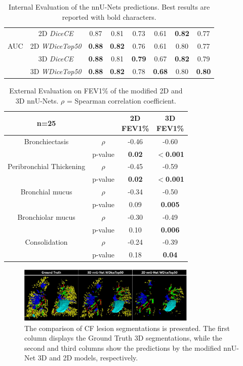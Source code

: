 \documentclass{article}
\begin{document}
\begin{table}[htb]
\begin{tabular*}{\textwidth}{@{\extracolsep{\fill}} cccccccc}
\hline
 & 2D \textit{DiceCE} & 0.87  & 0.81  & 0.73  & 0.61  & \textbf{0.82}  & 0.77 \\
AUC  & 2D \textit{WDiceTop50} & \textbf{0.88}  & \textbf{0.82}  & 0.76  & 0.61  & 0.80  & 0.77 \\
 & 3D \textit{DiceCE}  & \textbf{0.88} & 0.81  & \textbf{0.79}  & 0.67 & \textbf{0.82} & 0.79 \\
 & 3D \textit{WDiceTop50} & \textbf{0.88} & \textbf{0.82} & 0.78 & \textbf{0.68}  & 0.80 & \textbf{0.80} \\
\bottomrule
\end{tabular*}
\caption{Internal Evaluation of the nnU-Nets predictions. Best results are reported with bold characters.}\label{intern}
\setlength{\tabcolsep}{5.6pt}
\end{table}


\begin{table}[htb]
\centering
\small
\begin{tabular}{cccc}
\toprule
n=25 &  & \shortstack{2D\\FEV1\%} & \shortstack{3D\\FEV1\%} \\
\midrule
\textcolor{bron}{Bronchiectasis} & $\rho$ & -0.46 & -0.60 \\
& p-value &  \textbf{0.02} &\textbf{ $<$0.001}\\
\hline
\textcolor{thick}{Peribronchial Thickening} & $\rho$ & -0.45 & -0.59 \\
& p-value &  \textbf{0.02} & \textbf{$<$0.001} \\
\hline
\textcolor{mial}{Bronchial mucus} & $\rho$ & -0.34 & -0.50 \\
& p-value &  0.09 & \textbf{0.005} \\
\hline
\textcolor{miolar}{Bronchiolar mucus} & $\rho$ & -0.30 & -0.49 \\
& p-value &  0.10 & \textbf{0.006} \\
\hline
\textcolor{cons}{Consolidation} & $\rho$ & -0.24 & -0.39 \\
& p-value &  0.18 & \textbf{0.04} \\
\bottomrule
\end{tabular}
\caption{External Evaluation on FEV1\% of the modified 2D and 3D nnU-Nets. $\rho$ = Spearman correlation coefficient.}\label{extern}
\end{table}


\begin{figure}
	\centering
		\includegraphics[width=8.5cm]{images/volumes3.eps}
	\caption{The comparison of CF lesion segmentations is presented. The first column displays the Ground Truth 3D segmentations, while the second and third columns show the predictions by the modified nnU-Net 3D and 2D models, respectively.}
	\label{fig:volumes}
\end{figure}
\end{document}

